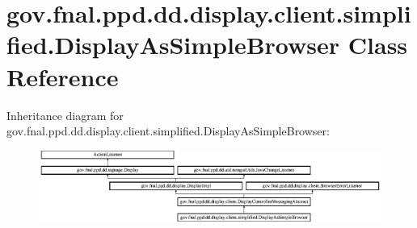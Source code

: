 \hypertarget{classgov_1_1fnal_1_1ppd_1_1dd_1_1display_1_1client_1_1simplified_1_1DisplayAsSimpleBrowser}{\section{gov.\-fnal.\-ppd.\-dd.\-display.\-client.\-simplified.\-Display\-As\-Simple\-Browser Class Reference}
\label{classgov_1_1fnal_1_1ppd_1_1dd_1_1display_1_1client_1_1simplified_1_1DisplayAsSimpleBrowser}
}
Inheritance diagram for gov.\-fnal.\-ppd.\-dd.\-display.\-client.\-simplified.\-Display\-As\-Simple\-Browser\-:\begin{figure}[H]
\begin{center}
\leavevmode
\includegraphics[height=2.350965cm]{classgov_1_1fnal_1_1ppd_1_1dd_1_1display_1_1client_1_1simplified_1_1DisplayAsSimpleBrowser}
\end{center}
\end{figure}
